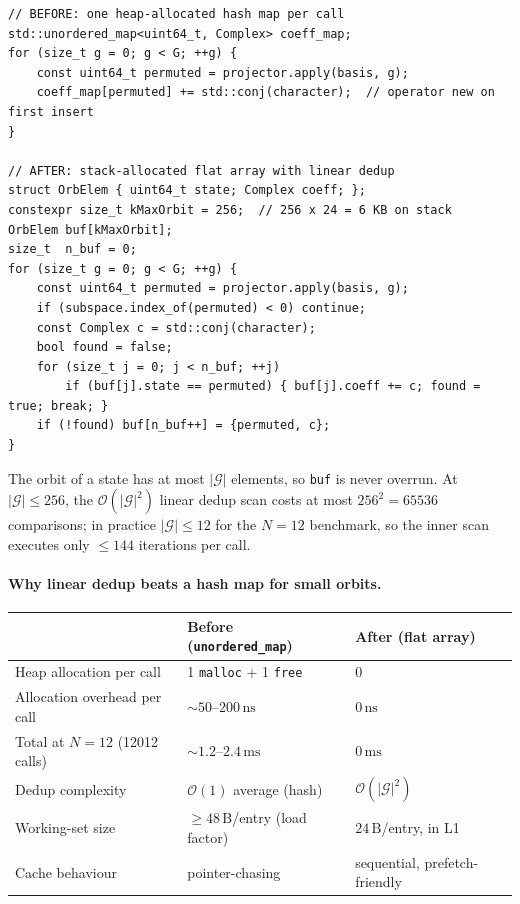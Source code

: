\documentclass[11pt,a4paper]{article}
\begin{document}
\begin{lstlisting}[caption={Fix 6 -- flat orbit accumulator (projector\_chain.h)}]
// BEFORE: one heap-allocated hash map per call
std::unordered_map<uint64_t, Complex> coeff_map;
for (size_t g = 0; g < G; ++g) {
    const uint64_t permuted = projector.apply(basis, g);
    coeff_map[permuted] += std::conj(character);  // operator new on first insert
}

// AFTER: stack-allocated flat array with linear dedup
struct OrbElem { uint64_t state; Complex coeff; };
constexpr size_t kMaxOrbit = 256;  // 256 x 24 = 6 KB on stack
OrbElem buf[kMaxOrbit];
size_t  n_buf = 0;
for (size_t g = 0; g < G; ++g) {
    const uint64_t permuted = projector.apply(basis, g);
    if (subspace.index_of(permuted) < 0) continue;
    const Complex c = std::conj(character);
    bool found = false;
    for (size_t j = 0; j < n_buf; ++j)
        if (buf[j].state == permuted) { buf[j].coeff += c; found = true; break; }
    if (!found) buf[n_buf++] = {permuted, c};
}
\end{lstlisting}

The orbit of a state has at most $|\mathcal{G}|$ elements, so
\texttt{buf} is never overrun.  At $|\mathcal{G}| \le 256$, the
$\mathcal{O}(|\mathcal{G}|^2)$ linear dedup scan costs at most $256^2 = 65536$
comparisons; in practice $|\mathcal{G}| \le 12$ for the $N=12$ benchmark, so
the inner scan executes only $\le 144$ iterations per call.

\paragraph{Why linear dedup beats a hash map for small orbits.}

\begin{center}
\begin{tabular}{@{}lll@{}}
\toprule
 & \textbf{Before (\texttt{unordered\_map})} & \textbf{After (flat array)} \\
\midrule
Heap allocation per call & 1 \texttt{malloc} + 1 \texttt{free} & 0 \\
Allocation overhead per call & $\sim 50$--$200\,\mathrm{ns}$ & $0\,\mathrm{ns}$ \\
Total at $N=12$ (12012 calls) & $\sim 1.2$--$2.4\,\mathrm{ms}$ & $0\,\mathrm{ms}$ \\
Dedup complexity & $\mathcal{O}(1)$ average (hash) & $\mathcal{O}(|\mathcal{G}|^2)$ \\
Working-set size & $\ge 48\,\mathrm{B}$/entry (load factor) & $24\,\mathrm{B}$/entry, in L1 \\
Cache behaviour & pointer-chasing & sequential, prefetch-friendly \\
\bottomrule
\end{tabular}
\end{center}
\end{document}
